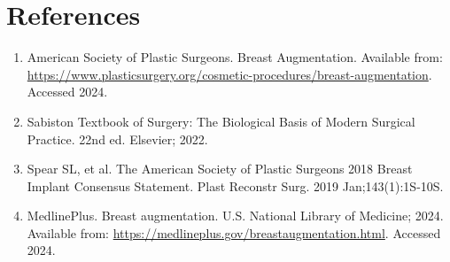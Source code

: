 \section*{References}
\begin{enumerate}
  \item American Society of Plastic Surgeons. Breast Augmentation. Available from: \url{https://www.plasticsurgery.org/cosmetic-procedures/breast-augmentation}. Accessed 2024.
  \item Sabiston Textbook of Surgery: The Biological Basis of Modern Surgical Practice. 22nd ed. Elsevier; 2022.
  \item Spear SL, et al. The American Society of Plastic Surgeons 2018 Breast Implant Consensus Statement. Plast Reconstr Surg. 2019 Jan;143(1):1S-10S.
  \item MedlinePlus. Breast augmentation. U.S. National Library of Medicine; 2024. Available from: \url{https://medlineplus.gov/breastaugmentation.html}. Accessed 2024.
\end{enumerate}

\clearpage
